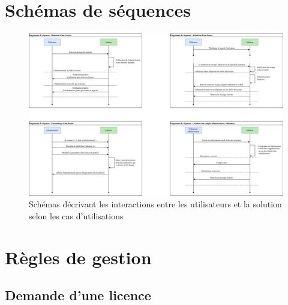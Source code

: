 \section{Schémas de séquences}

\begin{figure}[h]
	\centering
	\includegraphics[width=16cm]{main/Seq.png}
	\caption{Schémas décrivant les interactions entre les utilisateurs et la solution selon les cas d'utilisations}
	\label{fig:fig3}
\end{figure}

\newpage
\section{Règles de gestion}

\subsection{Demande d'une licence}

